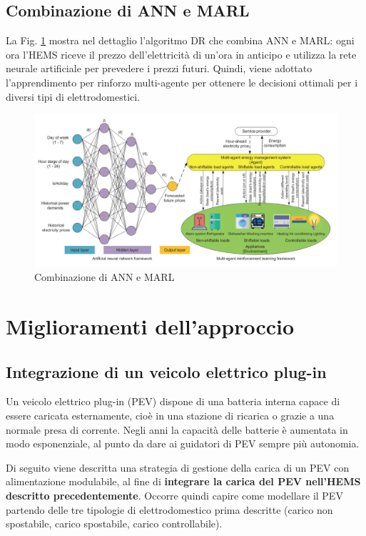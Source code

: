 \documentclass[italian, Lau, oneside]{sapthesis}
\begin{document}
\section{Combinazione di ANN e MARL}
La Fig. \ref{fig:architettura} mostra nel dettaglio l'algoritmo DR che combina ANN e MARL: ogni ora l'HEMS riceve il prezzo dell'elettricità di un'ora in anticipo e utilizza la rete neurale artificiale per prevedere i prezzi futuri. Quindi, viene adottato l'apprendimento per rinforzo multi-agente per ottenere le decisioni ottimali per i diversi tipi di elettrodomestici.

\begin{figure}[h]
    \centering
    \includegraphics[width=\textwidth]{Architettura ANN MARL.png}
    \caption{Combinazione di ANN e MARL}
    \label{fig:architettura}
\end{figure}


\chapter{Miglioramenti dell'approccio}
\label{cap:4}
\section{Integrazione di un veicolo elettrico plug-in}
Un veicolo elettrico plug-in (PEV) dispone di una batteria interna capace di essere caricata esternamente, cioè in una stazione di ricarica o grazie a una normale presa di corrente. Negli anni la capacità delle batterie è aumentata in modo esponenziale, al punto da dare ai guidatori di PEV sempre più autonomia. 

Di seguito viene descritta una strategia di gestione della carica di un PEV con alimentazione modulabile, al fine di \textbf{integrare la carica del PEV nell'HEMS descritto precedentemente}. Occorre quindi capire come modellare il PEV partendo delle tre tipologie di elettrodomestico prima descritte (carico non spostabile, carico spostabile, carico controllabile).
\end{document}
